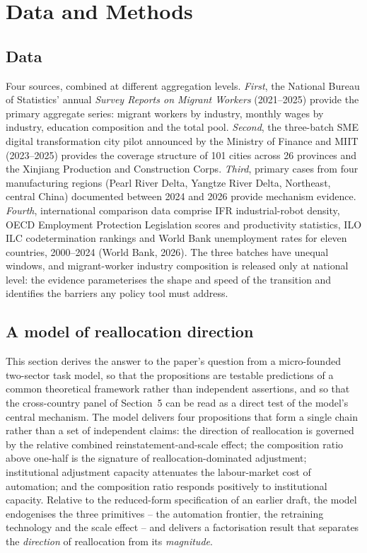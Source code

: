 \documentclass[12pt]{article}
\begin{document}
\section{Data and Methods}

\subsection{Data}

Four sources, combined at different aggregation levels. \emph{First}, the National Bureau of Statistics' annual \emph{Survey Reports on Migrant Workers} (2021--2025) provide the primary aggregate series: migrant workers by industry, monthly wages by industry, education composition and the total pool. \emph{Second}, the three-batch SME digital transformation city pilot announced by the Ministry of Finance and MIIT (2023--2025) provides the coverage structure of 101 cities across 26 provinces and the Xinjiang Production and Construction Corps. \emph{Third}, primary cases from four manufacturing regions (Pearl River Delta, Yangtze River Delta, Northeast, central China) documented between 2024 and 2026 provide mechanism evidence. \emph{Fourth}, international comparison data comprise IFR industrial-robot density, OECD Employment Protection Legislation scores and productivity statistics, ILO ILC codetermination rankings and World Bank unemployment rates for eleven countries, 2000--2024 (World Bank, 2026). The three batches have unequal windows, and migrant-worker industry composition is released only at national level: the evidence parameterises the shape and speed of the transition and identifies the barriers any policy tool must address.

\subsection{A model of reallocation direction}

This section derives the answer to the paper's question from a micro-founded two-sector task model, so that the propositions are testable predictions of a common theoretical framework rather than independent assertions, and so that the cross-country panel of Section~5 can be read as a direct test of the model's central mechanism. The model delivers four propositions that form a single chain rather than a set of independent claims: the direction of reallocation is governed by the relative combined reinstatement-and-scale effect; the composition ratio above one-half is the signature of reallocation-dominated adjustment; institutional adjustment capacity attenuates the labour-market cost of automation; and the composition ratio responds positively to institutional capacity. Relative to the reduced-form specification of an earlier draft, the model endogenises the three primitives -- the automation frontier, the retraining technology and the scale effect -- and delivers a factorisation result that separates the \emph{direction} of reallocation from its \emph{magnitude}.
\end{document}
